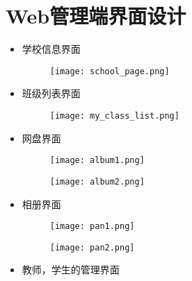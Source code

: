 \section{Web管理端界面设计}

\begin{itemize}

\item 学校信息界面

\begin{figure}[H]
  \centering
  \texttt{[image: school\_page.png]}
  \label{fig: pc_schoolinfo}
\end{figure}


\item 班级列表界面

\begin{figure}[H]
  \centering
  \texttt{[image: my\_class\_list.png]}
  \label{fig: pc_classlist}
\end{figure}


\item 网盘界面

\begin{figure}[H]
  \centering
  \texttt{[image: album1.png]}
  \label{fig: pc_album1}
\end{figure}



\begin{figure}[H]
  \centering
  \texttt{[image: album2.png]}
  \label{fig: pc_album2}
\end{figure}


\item 相册界面

\begin{figure}[H]
  \centering
  \texttt{[image: pan1.png]}
  \label{fig: pc_pan1}
\end{figure}



\begin{figure}[H]
  \centering
  \texttt{[image: pan2.png]}
  \label{fig: pc_pan2}
\end{figure}



\item 教师，学生的管理界面


\end{itemize}
